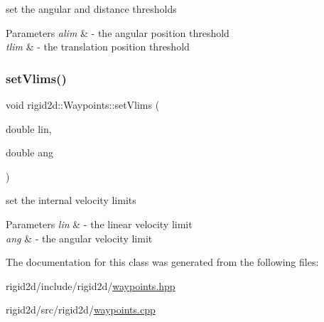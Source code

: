 set the angular and distance thresholds 


\begin{DoxyParams}{Parameters}
{\em alim} & -\/ the angular position threshold \\
\hline
{\em tlim} & -\/ the translation position threshold \\
\hline
\end{DoxyParams}
\mbox{\label{classrigid2d_1_1Waypoints_a7ab69beb06eae9eb6f8c110748a6454f}} 
\subsubsection{\texorpdfstring{set\+Vlims()}{setVlims()}}
{\footnotesize\ttfamily void rigid2d\+::\+Waypoints\+::set\+Vlims (\begin{DoxyParamCaption}\item[{double}]{lin,  }\item[{double}]{ang }\end{DoxyParamCaption})}



set the internal velocity limits 


\begin{DoxyParams}{Parameters}
{\em lin} & -\/ the linear velocity limit \\
\hline
{\em ang} & -\/ the angular velocity limit \\
\hline
\end{DoxyParams}


The documentation for this class was generated from the following files\+:\begin{DoxyCompactItemize}
\item 
rigid2d/include/rigid2d/\hyperlink{waypoints_8hpp}{waypoints.\+hpp}\item 
rigid2d/src/rigid2d/\hyperlink{waypoints_8cpp}{waypoints.\+cpp}\end{DoxyCompactItemize}
